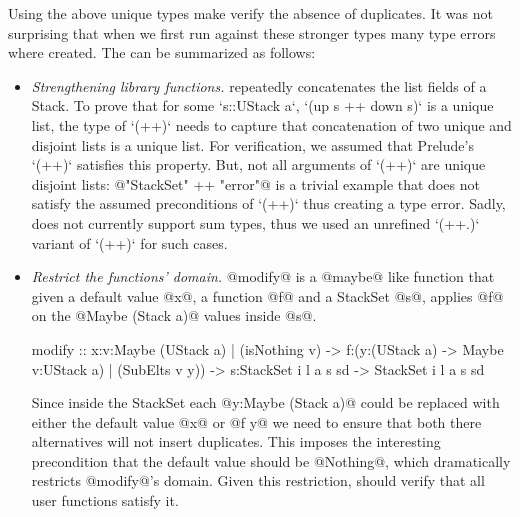 Using the above unique types make \toolname verify the absence of duplicates.
%
It was not surprising that when we first run \toolname 
against these stronger types many type errors where created.
%
The 
can be summarized as follows:
\begin{itemize}
	\item\emph{Strengthening library functions.}
      \lbxmonad repeatedly concatenates the list fields of a Stack.
      To prove that for some `s::UStack a`, `(up s ++ down s)` is a unique list, 
      the type of `(++)`
      needs to capture that concatenation of two unique and disjoint lists is a unique list.
      For verification, we assumed that Prelude's `(++)` satisfies this property.
      But, not all arguments of `(++)` are unique disjoint lists:
      @"StackSet" ++ "error"@ is a trivial example that does not satisfy
      the assumed preconditions of `(++)` thus creating a type error.
      Sadly, \toolname does not currently support sum types, 
      thus we used an unrefined `(++.)` variant of `(++)` for such cases.
     
	\item\emph{Restrict the functions' domain.}
	@modify@ is a @maybe@ like function
	that given a default value @x@,
	a function @f@ and a StackSet @s@,
	applies @f@ on the @Maybe (Stack a)@ values inside @s@. 
\begin{code}
modify :: 
    x:{v:Maybe (UStack a) | (isNothing v)}
 -> f:(y:(UStack a) 
     -> Maybe {v:UStack a) | (SubElts v y)})
 -> s:StackSet i l a s sd 
 -> StackSet i l a s sd
\end{code}
	Since inside the StackSet each @y:Maybe (Stack a)@
	could be replaced with either the default value @x@
	or @f y@ we need to ensure that both there alternatives
	will not insert duplicates.
	This imposes the interesting precondition that the default
	value should be @Nothing@, which dramatically restricts 
	@modify@'s domain.
	Given this restriction, \toolname should verify 
	that all user functions satisfy it.
			

\end{itemize}

